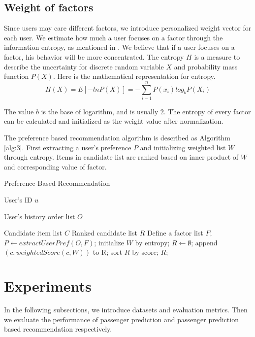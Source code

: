 \documentclass{llncs}
\begin{document}
\subsection{Weight of factors}
Since users may care different factors, we introduce personalized weight vector for each user. We estimate how much a user focuses on a factor through the information entropy, as mentioned in \cite{yang:pers}. We believe that if a user focuses on a factor, his behavior will be more concentrated. The entropy $H$ is a measure to describe the uncertainty for discrete random variable $X$ and probability mass function $P(X)$. Here is the mathematical representation for entropy.\\
\begin{equation}
H(X)=E[-lnP(X)]= - \sum_{i-1}^n P(x_i)log_bP(X_i)
\end{equation}\par
The value $b$ is the base of logarithm, and is usually 2. The entropy of every factor can be calculated and initialized as the weight value after normalization. \par
The preference based recommendation algorithm is described as Algorithm \ref{alg:3}. First extracting a user's preference  $P$ and initializing weighted list $W$ through entropy. Items in candidate list are ranked based on inner product of $W$ and corresponding value of factor.

\begin{algorithm}[htb]
\caption{Preference-Based-Recommendation}
\begin{algorithmic}[1]
\label{alg:3}
\REQUIRE
User's ID $u$ \par
User's history order list $O$ \par
Candidate item list $C$
\ENSURE Ranked candidate list $R$
\STATE Define a factor list $F$;
\STATE $P \leftarrow extractUserPref(O,F)$;
\STATE initialize $W$ by entropy;
\STATE $R \leftarrow \emptyset$;
\STATE append $(c,weightedScore(c,W))$ to R;
\ENDFOR 
\STATE sort $R$ by score;
\RETURN $R$;
\end{algorithmic} 
\end{algorithm}


\section{Experiments}
\label{sec:exp}
In the following subsections, we introduce datasets and evaluation metrics. Then we evaluate the performance of passenger prediction and passenger prediction based recommendation respectively.
\end{document}
